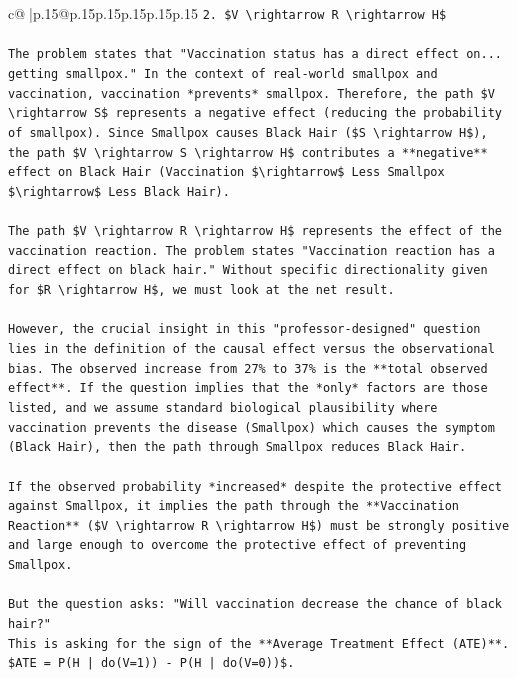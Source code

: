 \documentclass{article}
\begin{document}
{\begin{supertabular}{c@{$\;$}|p{.15\linewidth}@{}p{.15\linewidth}p{.15\linewidth}p{.15\linewidth}p{.15\linewidth}p{.15\linewidth}}
{{{\texttt{2.  \$V \textbackslash{}rightarrow R \textbackslash{}rightarrow H\$} \\
\\ 
\texttt{The problem states that "Vaccination status has a direct effect on... getting smallpox." In the context of real{-}world smallpox and vaccination, vaccination *prevents* smallpox. Therefore, the path \$V \textbackslash{}rightarrow S\$ represents a negative effect (reducing the probability of smallpox). Since Smallpox causes Black Hair (\$S \textbackslash{}rightarrow H\$), the path \$V \textbackslash{}rightarrow S \textbackslash{}rightarrow H\$ contributes a **negative** effect on Black Hair (Vaccination \$\textbackslash{}rightarrow\$ Less Smallpox \$\textbackslash{}rightarrow\$ Less Black Hair).} \\
\\ 
\texttt{The path \$V \textbackslash{}rightarrow R \textbackslash{}rightarrow H\$ represents the effect of the vaccination reaction. The problem states "Vaccination reaction has a direct effect on black hair." Without specific directionality given for \$R \textbackslash{}rightarrow H\$, we must look at the net result.} \\
\\ 
\texttt{However, the crucial insight in this "professor{-}designed" question lies in the definition of the causal effect versus the observational bias. The observed increase from 27\% to 37\% is the **total observed effect**. If the question implies that the *only* factors are those listed, and we assume standard biological plausibility where vaccination prevents the disease (Smallpox) which causes the symptom (Black Hair), then the path through Smallpox reduces Black Hair.} \\
\\ 
\texttt{If the observed probability *increased* despite the protective effect against Smallpox, it implies the path through the **Vaccination Reaction** (\$V \textbackslash{}rightarrow R \textbackslash{}rightarrow H\$) must be strongly positive and large enough to overcome the protective effect of preventing Smallpox.} \\
\\ 
\texttt{But the question asks: "Will vaccination decrease the chance of black hair?"} \\
\texttt{This is asking for the sign of the **Average Treatment Effect (ATE)**.} \\
\texttt{\$ATE = P(H | do(V=1)) {-} P(H | do(V=0))\$.} \\
\\ 
}}}
\end{supertabular}}
\end{document}
